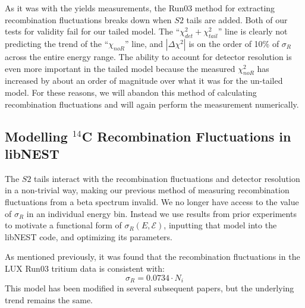 As it was with the yields measurements, the Run03 method for extracting recombination fluctuations breaks down when $S2$ tails are added. Both of our tests for validity fail for our tailed model. The ``$\chi_{det}^2+\chi_{tail}^2$'' line is clearly not predicting the trend of the ``$\chi_{noR}$'' line, and $|\Delta\chi^2|$ is on the order of 10\% of $\sigma_{R}$ across the entire energy range. The ability to account for detector resolution is even more important in the tailed model because the measured $\chi_{noR}^2$ has increased by about an order of magnitude over what it was for the un-tailed model. For these reasons, we will abandon this method of calculating recombination fluctuations and will again perform the measurement numerically. 


\subsection{Modelling $^{14}$C Recombination Fluctuations in libNEST}\label{sec:sigrupdate}
The $S2$ tails interact with the recombination fluctuations and detector resolution in a non-trivial way, making our previous method of measuring recombination fluctuations from a beta spectrum invalid. We no longer have access to the value of $\sigma_R$ in an individual energy bin. Instead we use results from prior experiments to motivate a functional form of $\sigma_R(E,\mathcal{E})$, inputting that model into the libNEST code, and optimizing its parameters. 

As mentioned previously, it was found that the recombination fluctuations in the LUX Run03 tritium data is consistent with\cite{lux_tritium}:
\begin{equation}
\sigma_R=0.0734 \cdot N_i
\end{equation}
This model has been modified in several subsequent papers, but the underlying trend remains the same.


